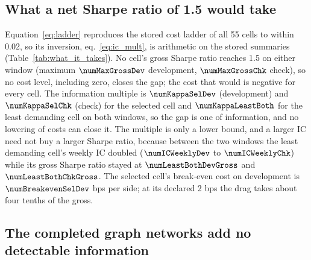 \begin{table}[t]
\centering\footnotesize
\setlength{\tabcolsep}{5pt}
\caption{The check window by calendar year (post-hoc split): yearly mean of the monthly rank IC of the fixed booster, and calendar-year net return of the monthly decile long-short book (ALL, 15 bps) and of a neutral rank-weighted book held in three-month cohorts.}
\label{tab:crisis}

\end{table}

\subsection{What a net Sharpe ratio of 1.5 would take}\label{sec:res_takes}

Equation~\eqref{eq:ladder} reproduces the stored cost ladder of all 55 cells to within 0.02, so its inversion, eq.~\eqref{eq:ic_mult}, is arithmetic on the stored summaries (Table~\ref{tab:what_it_takes}). No cell's gross Sharpe ratio reaches 1.5 on either window (maximum $\numMaxGrossDev$ development, $\numMaxGrossChk$ check), so no cost level, including zero, closes the gap; the cost that would is negative for every cell. The information multiple is $\numKappaSelDev$ (development) and $\numKappaSelChk$ (check) for the selected cell and $\numKappaLeastBoth$ for the least demanding cell on both windows, so the gap is one of information, and no lowering of costs can close it. The multiple is only a lower bound, and a larger IC need not buy a larger Sharpe ratio, because between the two windows the least demanding cell's weekly IC doubled ($\numICWeeklyDev$ to $\numICWeeklyChk$) while its gross Sharpe ratio stayed at $\numLeastBothDevGross$ and $\numLeastBothChkGross$. The selected cell's break-even cost on development is $\numBreakevenSelDev$ bps per side; at its declared 2 bps the drag takes about four tenths of the gross.

\begin{table}[t]
\centering\footnotesize
\setlength{\tabcolsep}{3.5pt}
\caption{Cost-ladder inversion (eq.~\ref{eq:ic_mult}) for the selected cell and the least demanding cells: annual volatility $\sigma$, turns per year, declared cost $c_d$ and break-even cost $\hat c$ per side, the gross Sharpe ratio $S_g^{need}$ needed for net 1.5 at $c_d$, and the information multiple $\kappa$.}
\label{tab:what_it_takes}
\end{table}

\subsection{The completed graph networks add no detectable information}\label{sec:res_graphs}

